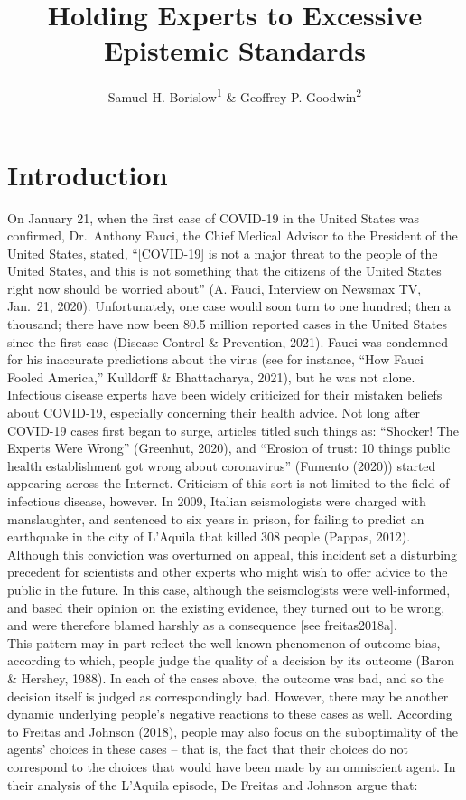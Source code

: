 \documentclass[
  man,floatsintext]{apa6}
\title{Holding Experts to Excessive Epistemic Standards}
\author{Samuel H. Borislow\textsuperscript{1} \& Geoffrey P. Goodwin\textsuperscript{2}}
\date{}
\affiliation{\vspace{0.5cm}\textsuperscript{1} University of Chicago\\\textsuperscript{2} University of Pennsylvania}
\begin{document}
\maketitle

\hypertarget{introduction}{%
\section{Introduction}\label{introduction}}

On January 21, when the first case of COVID-19 in the United States was confirmed, Dr.~Anthony Fauci, the Chief Medical Advisor to the President of the United States, stated, ``{[}COVID-19{]} is not a major threat to the people of the United States, and this is not something that the citizens of the United States right now should be worried about'' (A. Fauci, Interview on Newsmax TV, Jan.~21, 2020). Unfortunately, one case would soon turn to one hundred; then a thousand; there have now been 80.5 million reported cases in the United States since the first case (Disease Control \& Prevention, 2021). Fauci was condemned for his inaccurate predictions about the virus (see for instance, ``How Fauci Fooled America,'' Kulldorff \& Bhattacharya, 2021), but he was not alone. Infectious disease experts have been widely criticized for their mistaken beliefs about COVID-19, especially concerning their health advice. Not long after COVID-19 cases first began to surge, articles titled such things as: ``Shocker! The Experts Were Wrong'' (Greenhut, 2020), and ``Erosion of trust: 10 things public health establishment got wrong about coronavirus'' (Fumento (2020)) started appearing across the Internet. Criticism of this sort is not limited to the field of infectious disease, however. In 2009, Italian seismologists were charged with manslaughter, and sentenced to six years in prison, for failing to predict an earthquake in the city of L'Aquila that killed 308 people (Pappas, 2012). Although this conviction was overturned on appeal, this incident set a disturbing precedent for scientists and other experts who might wish to offer advice to the public in the future. In this case, although the seismologists were well-informed, and based their opinion on the existing evidence, they turned out to be wrong, and were therefore blamed harshly as a consequence {[}see freitas2018a{]}.\\
This pattern may in part reflect the well-known phenomenon of outcome bias, according to which, people judge the quality of a decision by its outcome (Baron \& Hershey, 1988). In each of the cases above, the outcome was bad, and so the decision itself is judged as correspondingly bad. However, there may be another dynamic underlying people's negative reactions to these cases as well. According to Freitas and Johnson (2018), people may also focus on the suboptimality of the agents' choices in these cases -- that is, the fact that their choices do not correspond to the choices that would have been made by an omniscient agent. In their analysis of the L'Aquila episode, De Freitas and Johnson argue that:\\
\end{document}
